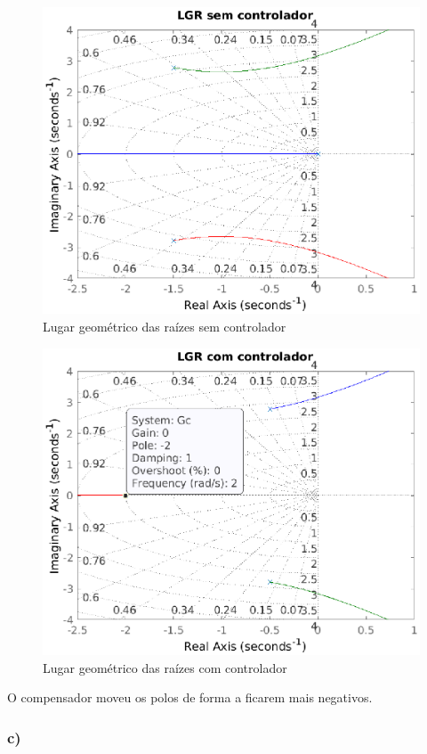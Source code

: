\begin{figure}[!ht]
    \centering
    \includegraphics[width = 0.75\linewidth]{Figuras/ProblemasPI/Problema1/LGRsemControlador.eps}
    \caption{Lugar geométrico das raízes sem controlador}
    \label{fig:LGR5Bsem}                   
\end{figure}

\begin{figure}[!ht]
    \centering
    \includegraphics[width = 0.75\linewidth]{Figuras/ProblemasPI/Problema1/LGRcomControlador.eps}
    \caption{Lugar geométrico das raízes com controlador}
    \label{fig:LGR5Bcom}                   
\end{figure}

O compensador moveu os polos de forma a ficarem mais negativos. 

\subsubsection*{c)}

